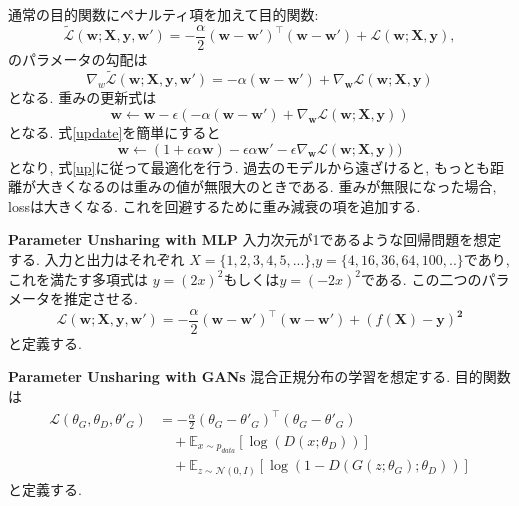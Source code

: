 \documentclass[techrep, submit, noauthor,preface]{ipsj}
\begin{document}
通常の目的関数にペナルティ項を加えて目的関数:
\begin{equation}
  \label{unshare}
  \tilde{\mathcal{L}}(\pmb{w}; \pmb{X}, \pmb{y}, \pmb{w}')
  =  - \frac{\alpha}{2} (\pmb{w} - \pmb{w}')^{\top}(\pmb{w} - \pmb{w}')  + \mathcal{L}(\pmb{w}; \pmb{X}, \pmb{y}),
\end{equation}
のパラメータの勾配は
\begin{equation}
  \label{nabla}
  \nabla_{w} \tilde{ \mathcal{L}}(\pmb{w}; \pmb{X}, \pmb{y}, \pmb{w}')
  =  - \alpha(\pmb{w} - \pmb{w}') + \nabla_{\pmb{w}}\mathcal{L}(\pmb{w}; \pmb{X}, \pmb{y})
\end{equation}
となる.
重みの更新式は
\begin{equation}
  \label{update}
  \pmb{w} \leftarrow \pmb{w} - \epsilon (- \alpha(\pmb{w} - \pmb{w}')
  + \nabla_{\pmb{w}}\mathcal{L}(\pmb{w}; \pmb{X}, \pmb{y}))
\end{equation}
となる.
式\ref{update}を簡単にすると
\begin{equation}
  \label{up}
  \pmb{w} \leftarrow (1 + \epsilon \alpha \pmb{w}) - \epsilon \alpha \pmb{w}'
  - \epsilon \nabla_{\pmb{w}}\mathcal{L}(\pmb{w}; \pmb{X}, \pmb{y}))
\end{equation}
となり, 式\ref{up}に従って最適化を行う.
過去のモデルから遠ざけると, もっとも距離が大きくなるのは重みの値が無限大のときである. 
重みが無限になった場合, lossは大きくなる. これを回避するために重み減衰の項を追加する.

{\bf Parameter Unsharing with MLP} 入力次元が1であるような回帰問題を想定する. 入力と出力はそれぞれ
$X = \{1, 2, 3, 4, 5,...\}$,$y = \{4, 16, 36, 64, 100,..\}$であり, これを満たす多項式は
$y = (2x)^{2}$もしくは$y = (-2x)^{2}$である. この二つのパラメータを推定させる.
\begin{equation}
  \label{regression}
  \mathcal{L}(\pmb{w}; \pmb{X}, \pmb{y}, \pmb{w}')
  =  - \frac{\alpha}{2} (\pmb{w} - \pmb{w}')^{\top}(\pmb{w} - \pmb{w}') + (f(\pmb{X}) - \pmb{y})^{\pmb{2}} 
\end{equation}      
と定義する.

{\bf Parameter Unsharing with GANs} 混合正規分布の学習を想定する. 目的関数は
\begin{equation}
  \label{gan}
  \begin{split}
    \mathcal{L}(\theta_{G}, \theta_{D}, \theta'_{G}) & =
    -\frac{\alpha}{2} (\theta_{G} - \theta'_{G})^{\top}(\theta_{G} - \theta'_{G}) \\
   & \quad +  \mathbb{E}_{x\sim p_{data}} [ \log(D(x; \theta_{D})) ]  \\
   & \quad + \mathbb{E}_{z\sim \mathcal{N}(0, I)} [ \log(1 - D(G(z;\theta_{G}); \theta_{D})) ]
   \end{split}
\end{equation}
と定義する.
\end{document}
